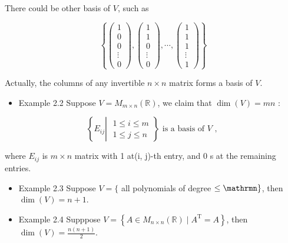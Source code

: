 \documentclass[11pt]{article}
\begin{document}
There could be other basis of \(V\), such as

\[
\left\{  {\left( \begin{matrix} 1 \\  0 \\  0 \\  \vdots \\  0 \end{matrix}\right) ,\left( \begin{matrix} 1 \\  1 \\  0\\  \vdots \\  0 \end{matrix}\right) ,\cdots ,\left( \begin{matrix} 1 \\  1 \\  1\\  \vdots \\  1 \end{matrix}\right) }\right\}
\]

Actually, the columns of any invertible \(n \times  n\) matrix forms a basis of \(V\).

\begin{itemize}
\item Example 2.2 Suppose \(V = {M}_{m \times  n}\left( \mathbb{R}\right)\), we claim that \(\dim \left( V\right)  = {mn}\) :
\end{itemize}

\[
\left\{  {{E}_{ij}\left| {\;\begin{array}{l} 1 \leq  i \leq  m \\  1 \leq  j \leq  n \end{array}}\right. }\right\}  \text{ is a basis of }V\text{ , }
\]

where \({E}_{ij}\) is \(m \times  n\) matrix with 1 at(i, j)-th entry, and 0 s at the remaining entries.

\begin{itemize}
\item Example 2.3 Suppose \(V = \{\) all polynomials of degree \(\leq  \mathrmn\}\), then \(\dim \left( V\right)  = n + 1\).
\end{itemize}

\begin{itemize}
\item Example 2.4 Supppose \(V = \left\{  {A \in  {M}_{n \times  n}\left( \mathbb{R}\right)  \mid  {A}^{\mathrm{T}} = A}\right\}\), then \(\dim \left( V\right)  = \frac{n\left( {n + 1}\right) }2\).
\end{itemize}
\end{document}
